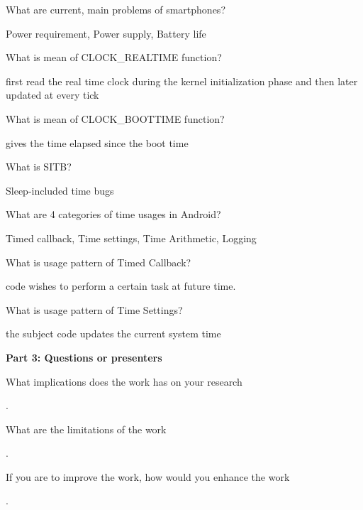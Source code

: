 \documentclass[addpoints, answers,  10pt]{exam}
\begin{document}
\begin{questions}
\question What are current, main problems of smartphones?
\begin{solutionorlines}[2cm]
 Power requirement, Power supply, Battery life
\end{solutionorlines}

\question What is mean of CLOCK\_REALTIME function?
\begin{solutionorlines}[2cm]
 first read the real time clock during the kernel initialization phase and then later updated at every tick
\end{solutionorlines}


\question What is mean of CLOCK\_BOOTTIME function?
\begin{solutionorlines}[2cm]
 gives the time elapsed since the boot time
\end{solutionorlines}

\question What is SITB?
\begin{solutionorlines}[2cm]
 Sleep-included time bugs
\end{solutionorlines}

\question What are 4 categories of time usages in Android?
\begin{solutionorlines}[2cm]
 Timed callback, Time settings, Time Arithmetic, Logging
\end{solutionorlines}

\question What is usage pattern of Timed Callback?
\begin{solutionorlines}[2cm]
 code wishes to perform a certain task at future time. 
\end{solutionorlines}

\question What is usage pattern of Time Settings?
\begin{solutionorlines}[2cm]
 the subject code updates the current system time
\end{solutionorlines}

\newpage
{\bfseries Part 3: Questions or presenters}

\question What implications does the work has on your research
\begin{solutionorlines}[5cm]
.
\end{solutionorlines}


\question What are the limitations of the work
\begin{solutionorlines}[5cm]
.
\end{solutionorlines}


\question If you are to improve the work, how would you enhance the work
\begin{solutionorlines}[5cm]
.
\end{solutionorlines}








\end{questions}
\end{document}
